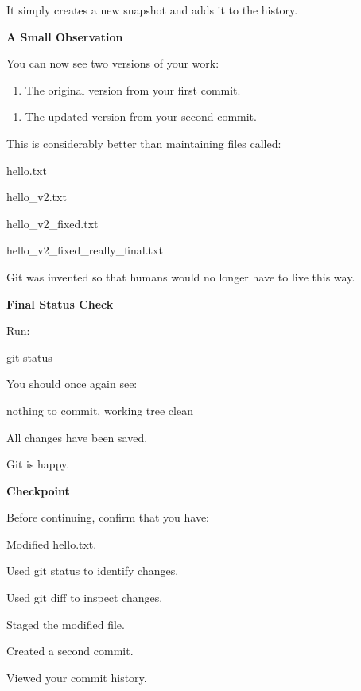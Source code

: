 \documentclass{csc2059practical}
\begin{document}
It simply creates a new snapshot and adds it to the history.

\begin{commonerror}
\textbf{A Small Observation}\par
\medskip

You can now see two versions of your work:


\begin{enumerate}
  \item The original version from your first commit.
\end{enumerate}

\begin{enumerate}
  \item The updated version from your second commit.
\end{enumerate}

This is considerably better than maintaining files called:


\end{commonerror}
\begin{terminalplain}
hello.txt
\end{terminalplain}
hello\_v2.txt

hello\_v2\_fixed.txt

hello\_v2\_fixed\_really\_final.txt

Git was invented so that humans would no longer have to live this way.

\begin{commonerror}
\textbf{Final Status Check}\par
\medskip

Run:


\end{commonerror}
\begin{terminalplain}
git status
\end{terminalplain}
You should once again see:

\begin{terminalplain}
nothing to commit, working tree clean
\end{terminalplain}
All changes have been saved.

Git is happy.

\begin{reflectionbox}
\textbf{Checkpoint}\par
\medskip

Before continuing, confirm that you have:


Modified hello.txt.


Used git status to identify changes.


Used git diff to inspect changes.


Staged the modified file.


Created a second commit.


Viewed your commit history.


\end{reflectionbox}
\end{document}

